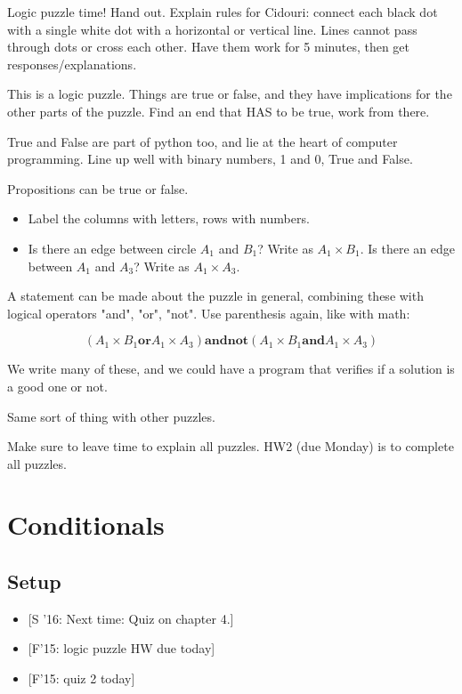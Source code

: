 \documentclass{article}
\begin{document}
Logic puzzle time!  Hand out. Explain rules for Cidouri: connect each
black dot with a single white dot with a horizontal or vertical line.
Lines cannot pass through dots or cross each other.  Have them work
for 5 minutes, then get responses/explanations.

This is a logic puzzle.  Things are true or false, and they have
implications for the other parts of the puzzle.  Find an end that HAS
to be true, work from there.

True and False are part of python too, and lie at the heart of
computer programming.  Line up well with binary numbers, 1 and 0, True
and False.

Propositions can be true or false.
\begin{itemize}
\item Label the columns with letters, rows with numbers.
\item Is there an edge between circle $A_1$ and $B_1$?  Write as $A_1
  \times B_1$. Is there an edge between $A_1$ and $A_3$? Write as $A_1
  \times A_3$.
\end{itemize}
A statement can be made about the puzzle in general, combining these
with logical operators "and", "or", "not".  Use parenthesis again, like
with math:

\newcommand{\orr}{\mathbin{\mathbf{or}}}
\newcommand{\andd}{\mathbin{\mathbf{and}}}
\newcommand{\nott}{\mathbin{\mathbf{not}}}

\[ (A_1 \times B_1 \orr A_1 \times A_3) \andd \nott (A_1 \times B_1 \andd A_1
\times A_3) \]

We write many of these, and we could have a program that verifies if a
solution is a good one or not.

Same sort of thing with other puzzles.

Make sure to leave time to explain all puzzles.  HW2 (due Monday) is
to complete all puzzles.

\newpage

\section{Conditionals}

\subsection*{Setup}

\begin{itemize}
\item{} [S '16: Next time: Quiz on chapter 4.]
\item{} [F'15: logic puzzle HW due today]
\item{} [F'15: quiz 2 today]
\end{itemize}
\end{document}
